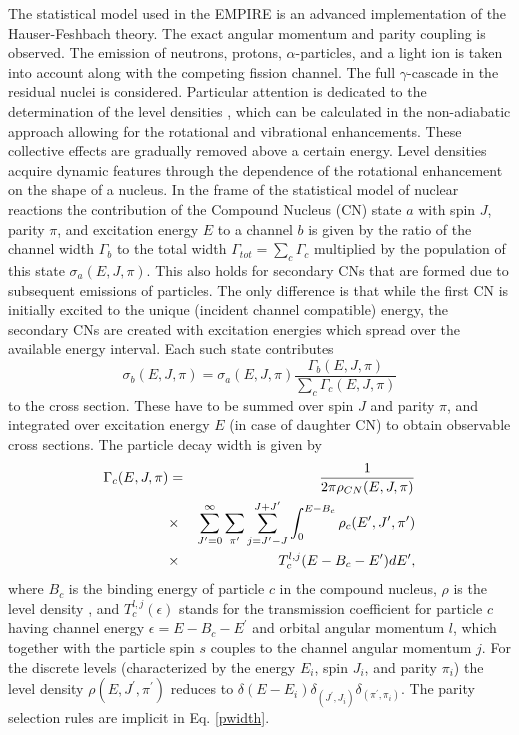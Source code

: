 The statistical model used in the EMPIRE is an advanced implementation of
the Hauser-Feshbach%
 theory. The exact angular momentum and parity
coupling is observed. The emission of neutrons, protons, $\alpha$-particles,
and a light ion is taken into account along with the competing fission
channel. The full $\gamma$-cascade in the residual nuclei is considered.
Particular attention is dedicated to the determination of the level densities%
, which can be calculated in the non-adiabatic
approach allowing for the rotational and vibrational enhancements. These
collective effects are gradually removed above a certain energy. Level
densities acquire dynamic features through the dependence of the rotational
enhancement on the shape of a nucleus. In the frame of the statistical model
of nuclear reactions the contribution of the Compound Nucleus (CN) state $a$
with spin $J$, parity $\pi$, and excitation energy $E$ to a channel $b$ is
given by the ratio of the channel width $\Gamma_{b}$ to the total width $%
\Gamma_{tot}=\sum_{c}\Gamma_{c}$ multiplied by the population of this state $%
\sigma_{a}(E,J,\pi)$. This also holds for secondary CNs that are formed due
to subsequent emissions of particles. The only difference is that while the
first CN is initially excited to the unique (incident channel compatible)
energy, the secondary CNs are created with excitation energies which spread
over the available energy interval. Each such state contributes \noindent
\begin{equation}
\sigma_{b}(E,J,\pi)=\sigma_{a}(E,J,\pi)%
\frac{\Gamma_{b}(E,J,\pi)}{\sum_{c}\Gamma_{c}(E,J,\pi)}  \label{Hauser}
\end{equation}
\noindent to the cross section. These have to be summed over spin $J$ and
parity $\pi$, and integrated over excitation energy $E$ (in case of daughter
CN) to obtain observable cross sections. The particle decay width is given
by
\begin{eqnarray}
\Gamma_{c}(E,J,\pi)&=&\frac{1}{2\pi\rho_{CN}(E,J,\pi)}  \nonumber \\
&\times&\sum_{J^{\prime}=0}^{\infty}\sum_{\pi^{\prime}}\sum_{j=J^{%
\prime}-J}^{J+J^{\prime}}\int_{0}^{E-B_{c}}\rho_{c}(E^{\prime},J^{\prime},%
\pi^{\prime})  \nonumber \\
&\times&T_{c}^{l,j}(E-B_{c}-E^{\prime})dE^{\prime},  \label{pwidth}
\end{eqnarray}
\noindent where $B_{c}$ is the binding energy of particle $c$ in the
compound nucleus, $\rho$ is the level density%
, and $T_{c}^{l,j}(\epsilon)$ stands for the
transmission coefficient for particle $c$ having channel energy $%
\epsilon=E-B_{c}-E^{\prime}$ and orbital angular momentum $l$, which
together with the particle spin $s$ couples to the channel angular momentum $%
j$. For the discrete levels (characterized by the energy $E_{i}$, spin $J_{i}
$, and parity $\pi_{i}$) the level density $\rho(E,J^{\prime},\pi^{\prime})$
reduces to $\delta(E-E_{i})\delta_{(J^{\prime},J_{i})}\delta_{(\pi^{\prime},%
\pi_{i})}$. The parity selection rules are implicit in Eq. \ref{pwidth}.

